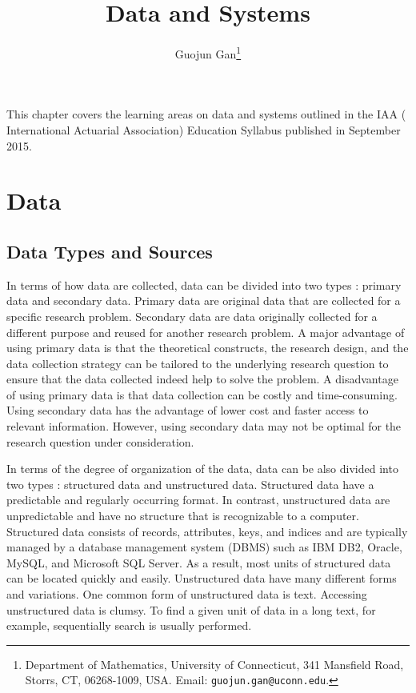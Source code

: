 \documentclass[12pt]{article}
\title{Data and Systems}
\author{Guojun Gan\thanks{Department of Mathematics, University of Connecticut, 341 Mansfield Road, Storrs, CT, 06268-1009, USA. Email: \texttt{guojun.gan@uconn.edu}.}}
\begin{document}
\maketitle

This chapter covers the learning areas on data and systems outlined in the IAA ( International Actuarial Association) Education Syllabus published in September 2015.

\section{Data}

%
\subsection{Data Types and Sources}

In terms of how data are collected, data can be divided into two types \citep{hox2005data}: primary data and secondary data. Primary data are original data that are collected for a specific research problem. Secondary data are data originally collected for a different purpose and reused for another research problem. A major advantage of using primary data is that the theoretical constructs, the research design, and the data collection strategy can be tailored to the underlying research question to ensure that the data collected indeed help to solve the problem. A disadvantage of using primary data is that data collection can be costly and time-consuming. Using secondary data has the advantage of lower cost and faster access to relevant information. However, using secondary data may not be optimal for the research question under consideration.   

In terms of the degree of organization of the data, data can be also divided into two types \citep{inmon2014,leary2013bigdata,hashem2015bigdata,abdullah2013data,pries2015}: structured data and unstructured data. Structured data have a predictable and regularly occurring format. In contrast, unstructured data are unpredictable and have no structure that is recognizable to a computer. Structured data consists of records, attributes, keys, and indices and are typically managed by a database management system (DBMS) such as IBM DB2, Oracle, MySQL, and Microsoft SQL Server. As a result, most units of structured data can be located quickly and easily. Unstructured data have many different forms and variations. One common form of unstructured data is text. Accessing unstructured data is clumsy. To find a given unit of data in a long text, for example, sequentially search is usually performed. 
\end{document}
